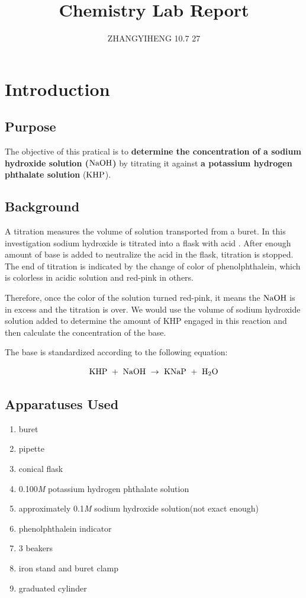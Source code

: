 \documentclass[12pt]{article}
\title{Chemistry Lab Report}
\author{ZHANGYIHENG 10.7 27}
\begin{document}
\maketitle
\begin{center}
    \tableofcontents
\end{center}
\setlength{\parindent}{4ex}
\section{Introduction}
\subsection{Purpose}
The objective of this pratical is to \textbf{determine the concentration of a sodium hydroxide solution (${\rm NaOH}$) } by titrating it against \textbf{a potassium hydrogen phthalate solution }(${\rm KHP}$).\par
\subsection{Background}
A titration measures the volume of solution transported from a buret. In this investigation sodium hydroxide is titrated into a flask with acid . After enough amount of base is added to neutralize the acid in the flask, titration is stopped. The end of titration is indicated by the change of color of phenolphthalein, which is colorless in acidic solution and red-pink in others. \par
Therefore, once the color of the solution turned red-pink, it means the ${\rm NaOH}$ is in excess and the titration is over. We would use the volume of sodium hydroxide solution added to determine the amount of KHP engaged in this reaction and then calculate the concentration of the base.\par
The base is standardized according to the following equation:\par
$${\rm 
KHP \ + \ NaOH \ \to \ KNaP \ + \ H_2O }
$$
\subsection{Apparatuses Used}
\begin{enumerate}
    \item buret
    \item pipette
    \item conical flask
    \item 0.100\textit{M} potassium hydrogen phthalate solution
    \item approximately 0.1\textit{M} sodium hydroxide solution(not exact enough)
    \item phenolphthalein indicator
    \item 3 beakers
    \item iron stand and buret clamp
    \item graduated cylinder
\end{enumerate}
\end{document}
